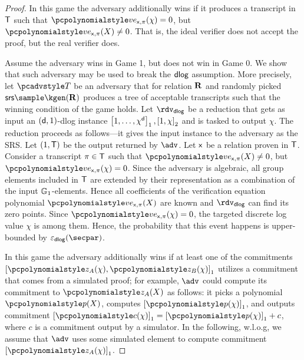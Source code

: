 \documentclass[runningheads,11pt]{llncs}
\begin{document}
\begin{proof}
   In this game the adversary additionally wins if it produces a
  transcript in $\mathsf{T}$ such that $\vereq_{\inp, \zkproof}(\chi) = 0$, but
  $\vereq_{\inp, \zkproof}(X) \neq 0$. That is, the ideal verifier does not
  accept the proof, but the real verifier does.

   Assume the adversary wins in Game 1, but
  does not win in Game 0. We show that such adversary may be used to break the
  $\mathsf{dlog}$ assumption. More precisely, let $\tdv$ be an adversary that for
  relation $\mathbf{R}$ and randomly picked $\srs \sample \kgen(\REL)$ produces a tree
  of acceptable transcripts such that the winning condition of the game
  holds. Let $\rdvdlog$ be a reduction that gets as input an
  $(\mathsf{d}, 1)$-dlog instance $\left[1, \ldots, \chi^{\mathsf{d}}\right]_{1}, \left[1, \chi\right]_{2}$ and
  is tasked to output $\chi$. The reduction proceeds as follows---it gives the
  input instance to the adversary as the SRS. Let $(1, \mathsf{T})$ be the output
  returned by $\adv$. Let $\mathsf{x}$ be a relation proven in $\mathsf{T}$.  Consider a
  transcript $\pi \in \mathsf{T}$ such that $\vereq_{\inp, \zkproof}(X) \neq 0$,
  but $\vereq_{\inp, \zkproof}(\chi) = 0$. Since the adversary is algebraic, all
  group elements included in $\mathsf{T}$ are extended by their representation as a
  combination of the input $\mathbb{G}_1$-elements. Hence all coefficients of the
  verification equation polynomial $\vereq_{\inp, \zkproof}(X)$ are known and
  $\rdvdlog$ can find its zero points. Since
  $\vereq_{\inp, \zkproof}(\chi) = 0$, the targeted discrete log value $\chi$ is
  among them.  Hence, the probability that this event happens is upper-bounded
  by $\epsdlog(\secpar)$.

   In this game the adversary additionally wins if at least one of
  the commitments $\gone{\p{z}_A (\chi), \p{z}_B (\chi)}$ utilizes a commitment
  that comes from a simulated proof; for example, $\adv$ could compute its
  commitment to $\p{z}_A(X)$ as follows: it picks a polynomial $\p{p} (X)$,
  computes $\gone{\p{p} (\chi)}$, and outputs commitment
  $\gone{\p{c} (\chi)} = \gone{\p{p} (\chi)} + c$, where $c$ is a commitment
  output by a simulator. In the following, w.l.o.g, we assume that $\adv$ uses
  some simulated element to compute commitment $\gone{\p{z}_A (\chi)}$.


\end{proof}
\end{document}

